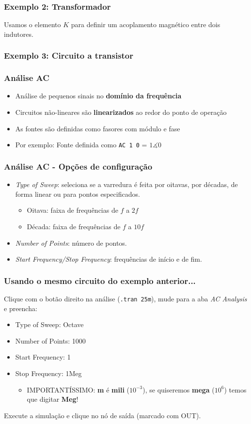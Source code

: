\documentclass{beamer}
\begin{document}
\begin{frame}
\frametitle{Exemplo 2: Transformador}
Usamos o elemento $K$ para definir um acoplamento magnético entre dois indutores.
\end{frame}

\begin{frame}
\frametitle{Exemplo 3: Circuito a transistor}
\end{frame}

\begin{frame}
\frametitle{Análise AC}
\begin{itemize}
\item{Análise de pequenos sinais no \textbf{domínio da frequência}}
\item{Circuitos não-lineares são \textbf{linearizados} ao redor do ponto de operação}
\item{As fontes são definidas como fasores com módulo e fase}
\item{Por exemplo: Fonte definida como \texttt{AC 1 0} = $1\measuredangle 0$} 
\end{itemize}
\end{frame}

\begin{frame}
\frametitle{Análise AC - Opções de configuração}
\begin{itemize}
\item{\textit{Type of Sweep}}: seleciona se a varredura é feita por oitavas, por décadas, de forma linear ou para pontos especificados.
\begin{itemize}
\item{Oitava}: faixa de frequências de $f$ a $2 f$
\item{Década}: faixa de frequências de $f$ a $10 f$
\end{itemize}
\item{\textit{Number of Points}}: número de pontos.
\item{\textit{Start Frequency/Stop Frequency}}: frequências de início e de fim.
\end{itemize}
\end{frame}

\begin{frame}
\frametitle{Usando o mesmo circuito do exemplo anterior...}
Clique com o botão direito na análise (\texttt{.tran 25m}), mude para a aba \textit{AC Analysis} e preencha:
\begin{itemize}

\item{Type of Sweep}: Octave
\item{Number of Points}: 1000
\item{Start Frequency}: 1
\item{Stop Frequency}: 1Meg
\begin{itemize}
\item{IMPORTANTÍSSIMO}: \textbf{m} é \textbf{mili} ($10^{-3}$), se quiseremos \textbf{mega} ($10^6$) temos que digitar \textbf{Meg}!
\end{itemize}
\end{itemize}
Execute a simulação e clique no nó de saída (marcado com OUT).
\end{frame}
\end{document}

